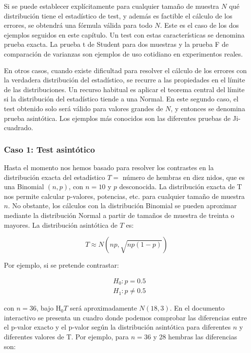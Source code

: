 \documentclass[
]{article}
\begin{document}
Si se puede establecer explícitamente para cualquier tamaño de muestra \(N\) qué distribución tiene el estadístico de test, y además es factible el cálculo de los errores, se obtendrá una fórmula válida para todo \(N\). Este es el caso de los dos ejemplos seguidos en este capítulo. Un test con estas características se denomina prueba exacta. La prueba t de Student para dos muestras y la prueba F de comparación de varianzas son ejemplos de uso cotidiano en experimentos reales.

En otros casos, cuando existe dificultad para resolver el cálculo de los errores con la verdadera distribución del estadístico, se recurre a las propiedades en el límite de las distribuciones. Un recurso habitual es aplicar el teorema central del límite si la distribución del estadístico tiende a una Normal. En este segundo caso, el test obtenido solo será válido para valores grandes de \(N\), y entonces se denomina prueba asintótica. Los ejemplos más conocidos son las diferentes pruebas de Ji-cuadrado.

\subsubsection{Caso 1: Test asintótico}\label{caso-1-test-asintuxf3tico}

Hasta el momento nos hemos basado para resolver los contrastes en la distribución exacta del estadístico \(T=\) número de hembras en diez nidos, que es una Binomial \((n, p)\), con \(n=10\) y \(p\) desconocida. La distribución exacta de T nos permite calcular p-valores, potencias, etc. para cualquier tamaño de muestra \(n\). No obstante, los cálculos con la distribución Binomial se pueden aproximar mediante la distribución Normal a partir de tamaños de muestra de treinta o mayores. La distribución asintótica de \(T\) es:

\[
T \approx N(n p, \sqrt{n p(1-p)})
\]

Por ejemplo, si se pretende contrastar:

\[
\begin{aligned}
& H_{0}: p=0.5 \\
& H_{1}: p \neq 0.5
\end{aligned}
\]

con \(n=36\), bajo \(\mathrm{H}_{0} T\) será aproximadamente \(N(18,3)\). En el documento interactivo se presenta un cuadro donde podemos comprobar las diferencias entre el p-valor exacto y el p-valor según la distribución asintótica para diferentes \(n\) y diferentes valores de T. Por ejemplo, para \(n=36\) y 28 hembras las diferencias son:
\end{document}
